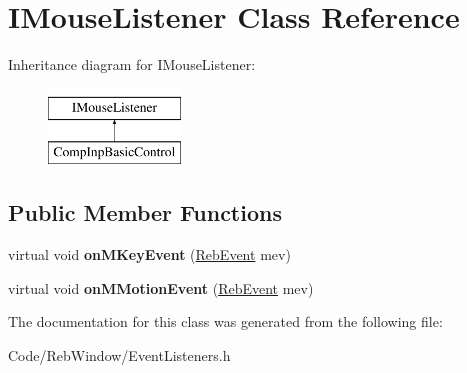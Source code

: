 \hypertarget{class_i_mouse_listener}{}\section{I\+Mouse\+Listener Class Reference}
\label{class_i_mouse_listener}
Inheritance diagram for I\+Mouse\+Listener\+:\begin{figure}[H]
\begin{center}
\leavevmode
\includegraphics[height=2.000000cm]{class_i_mouse_listener}
\end{center}
\end{figure}
\subsection*{Public Member Functions}
\begin{DoxyCompactItemize}
\item 
virtual void {\bfseries on\+M\+Key\+Event} (\hyperlink{union_reb_event}{Reb\+Event} mev)\hypertarget{class_i_mouse_listener_af770f498d374d8e63e97039ab4177253}{}\label{class_i_mouse_listener_af770f498d374d8e63e97039ab4177253}

\item 
virtual void {\bfseries on\+M\+Motion\+Event} (\hyperlink{union_reb_event}{Reb\+Event} mev)\hypertarget{class_i_mouse_listener_aa862db142bafd7ed53ce2ebdceefef00}{}\label{class_i_mouse_listener_aa862db142bafd7ed53ce2ebdceefef00}

\end{DoxyCompactItemize}


The documentation for this class was generated from the following file\+:\begin{DoxyCompactItemize}
\item 
Code/\+Reb\+Window/Event\+Listeners.\+h\end{DoxyCompactItemize}

